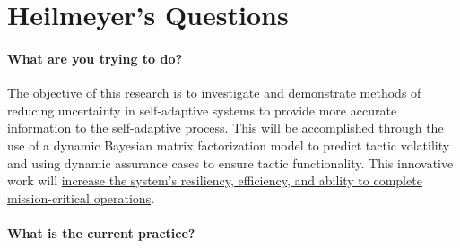 \documentclass[12pt]{article}
\begin{document}


\vspace{-5mm}
\section{Heilmeyer’s Questions} %


\vspace{-0mm}\paragraph{What are you trying to do?}


The objective of this research is to investigate and demonstrate methods of reducing uncertainty in self-adaptive systems to provide more accurate information to the self-adaptive process. This will be accomplished through the use of a dynamic Bayesian matrix factorization model to predict tactic volatility and using dynamic assurance cases to ensure tactic functionality. This innovative work will \ul{increase the system's resiliency, efficiency, and ability to complete mission-critical operations}.

\vspace{-4mm}
\vspace{-0mm}\paragraph{What is the current practice?} 
\end{document}
